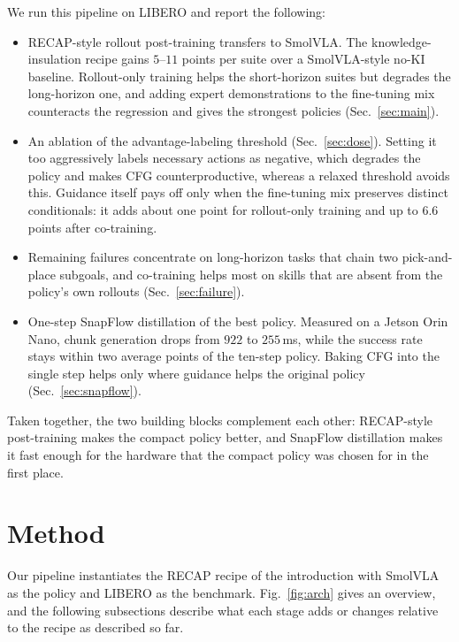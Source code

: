 \documentclass[conference]{IEEEtran}
\begin{document}
We run this pipeline on LIBERO and report the following:
\begin{itemize}
\item RECAP-style rollout post-training transfers to SmolVLA. The knowledge-insulation
recipe gains $5$--$11$ points per suite over a SmolVLA-style no-KI baseline. Rollout-only
training helps the short-horizon suites but degrades the long-horizon one, and adding
expert demonstrations to the fine-tuning mix counteracts the regression and gives the
strongest policies (Sec.~\ref{sec:main}).
\item An ablation of the advantage-labeling threshold (Sec.~\ref{sec:dose}). Setting it too
aggressively labels necessary actions as negative, which degrades the policy and makes CFG
counterproductive, whereas a relaxed threshold avoids this. Guidance itself pays off only
when the fine-tuning mix preserves distinct conditionals: it adds about one point for
rollout-only training and up to $6.6$ points after co-training.
\item Remaining failures concentrate on long-horizon tasks that chain two pick-and-place
subgoals, and co-training helps most on skills that are absent from the policy's own
rollouts (Sec.~\ref{sec:failure}).
\item One-step SnapFlow distillation of the best policy. Measured on a Jetson Orin Nano,
chunk generation drops from $922$ to $255$\,ms, while the success rate stays within two
average points of the ten-step policy. Baking CFG into the single step helps only where
guidance helps the original policy (Sec.~\ref{sec:snapflow}).
\end{itemize}
Taken together, the two building blocks complement each other: RECAP-style post-training
makes the compact policy better, and SnapFlow distillation makes it fast enough for the
hardware that the compact policy was chosen for in the first place.

\section{Method}
Our pipeline instantiates the RECAP recipe of the introduction with SmolVLA as the policy
and LIBERO as the benchmark. Fig.~\ref{fig:arch} gives an overview, and the following
subsections describe what each stage adds or changes relative to the recipe as described
so far.
\end{document}
